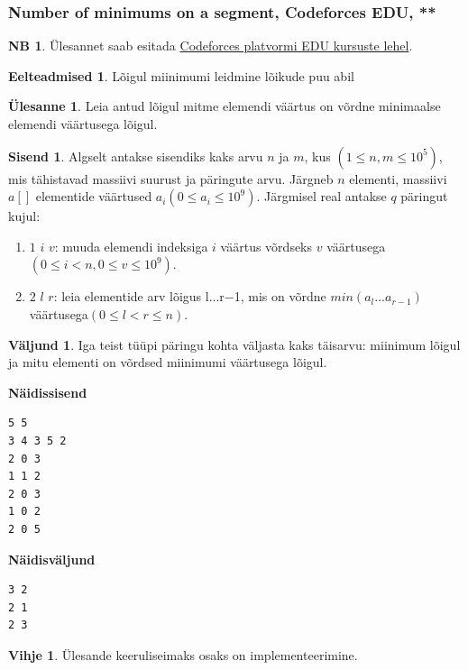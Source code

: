 \documentclass{trkut}
\theoremstyle{definition}
\newtheorem*{prereq}{Eelteadmised}
\newtheorem*{extra}{NB}
\newtheorem*{vihje}{Vihje}
\newtheorem*{Input}{Sisend}
\newtheorem*{Output}{Väljund}
\newtheorem*{Text}{Ülesanne}
\begin{document}
\subsubsection{Number of minimums on a segment, Codeforces EDU, **}
\begin{extra}
Ülesannet saab esitada \href{https://codeforces.com/edu/course/2/lesson/4/1/practice/contest/273169/problem/C}{Codeforces platvormi EDU kursuste lehel}.
\end{extra}
\begin{prereq}
Lõigul miinimumi leidmine lõikude puu abil
\end{prereq}
\begin{Text}
Leia antud lõigul mitme elemendi väärtus on võrdne minimaalse elemendi väärtusega lõigul.

\parencite{minseg}
\end{Text}
\begin{Input}
Algselt antakse sisendiks kaks arvu $n$ ja $m$, kus $(1\le n,m\le 10^5)$, mis tähistavad massiivi suurust ja päringute arvu.
Järgneb $n$ elementi, massiivi $a[]$ elementide väärtused $a_i$$(0\le a_i\le 10^9)$.
Järgmisel real antakse $q$ päringut kujul:
\begin{enumerate}
\item $1$ $i$ $v$: muuda elemendi indeksiga $i$ väärtus võrdseks $v$ väärtusega$(0\le i<n, 0\le v\le 10^9)$.
\item $2$ $l$ $r$: leia elementide arv lõigus l...r−1, mis on võrdne $min(a_l...a_{r-1})$ väärtusega$(0\le l<r\le n)$.
\end{enumerate}

\end{Input}
\begin{Output}
Iga teist tüüpi päringu kohta väljasta kaks täisarvu: miinimum lõigul ja mitu elementi on võrdsed miinimumi väärtusega lõigul.
\end{Output}

\textbf{Näidissisend}

\begin{verbatim}
5 5
3 4 3 5 2
2 0 3
1 1 2
2 0 3
1 0 2
2 0 5
\end{verbatim}

\textbf{Näidisväljund}

\begin{verbatim}
3 2
2 1
2 3
\end{verbatim}



\begin{vihje}
Ülesande keeruliseimaks osaks on implementeerimine.
\end{vihje}
\end{document}
